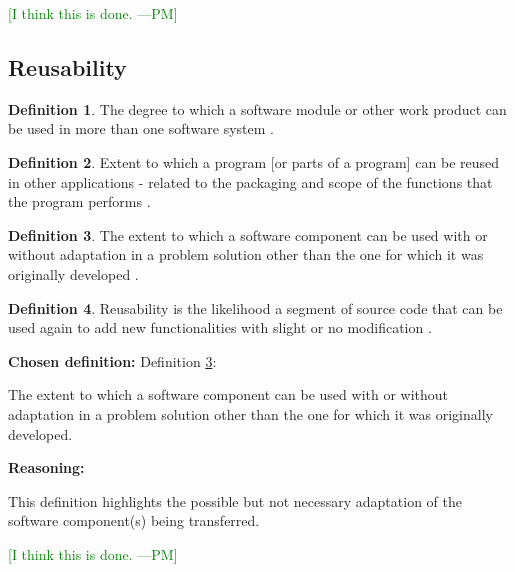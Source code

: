 \documentclass[letterpaper,cleveref]{lipics-v2019}
\newcommand{\authornote}[3]{\textcolor{#1}{[#3 ---#2]}}
\newcommand{\authornote}[3]{}
\newcommand{\pmi}[1]{\authornote{green}{PM}{#1}} %
\theoremstyle{definition}
\newtheorem{defn}{Definition}
\begin{document}
\pmi{I think this is done.}


\subsection{Reusability}
\begin{defn} 
The degree to which a software module or other work product can be used in more than one software system \citep{IEEEStdGlossarySET1990}. 
\end{defn}
\begin{defn}
Extent to which a program [or parts of a program] can be reused in other applications - related to the packaging and scope of the functions that the program performs \citep{pressman2005software}.
\end{defn}
\begin{defn} \label{ReusabilityDefnSelected}
The extent to which a software component can be used with or without adaptation in a problem solution other than the one for which it was originally developed \citep{kalagiakos2003non}.
\end{defn}
\begin{defn}
Reusability is the likelihood a segment of source code that can be used again to add new functionalities with slight or no modification \citep{sandhu2010survey}.
\end{defn}

\noindent \textbf{Chosen definition:} Definition \ref{ReusabilityDefnSelected}:

The extent to which a software component can be used with or without adaptation in a problem solution other than the one for which it was originally developed.

\noindent \textbf{Reasoning:}

This definition highlights the possible but not necessary adaptation of the software component(s) being transferred.

\pmi{I think this is done.}
\end{document}
